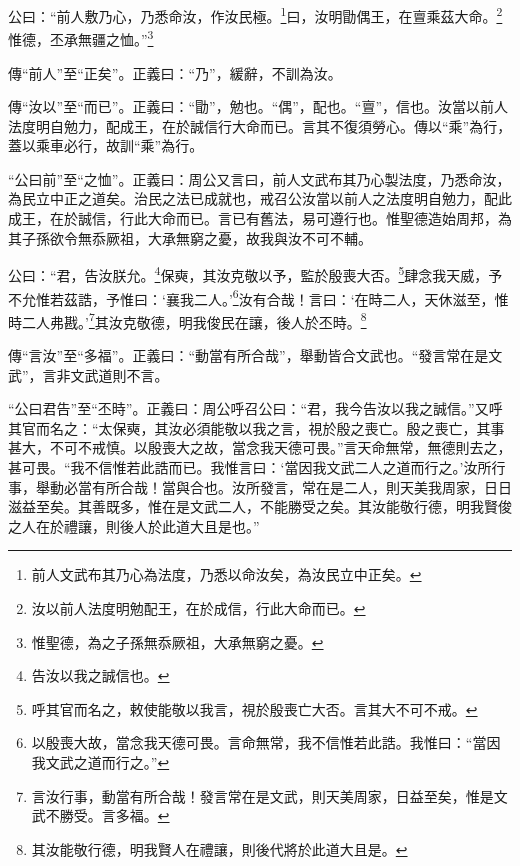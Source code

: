 公曰：“前人敷乃心，乃悉命汝，作汝民極。\footnote{前人文武布其乃心為法度，乃悉以命汝矣，為汝民立中正矣。}曰，汝明勖偶王，在亶乘茲大命。\footnote{汝以前人法度明勉配王，在於成信，行此大命而已。}惟德，丕承無疆之恤。”\footnote{惟聖德，為之子孫無忝厥祖，大承無窮之憂。}


{\noindent\zhuan{}\fzbyks 傳“前人”至“正矣”。正義曰：“乃”，緩辭，不訓為汝。 \par}

{\noindent\zhuan{}\fzbyks 傳“汝以”至“而已”。正義曰：“勖”，勉也。“偶”，配也。“亶”，信也。汝當以前人法度明自勉力，配成王，在於誠信行大命而已。言其不復須勞心。傳以“乘”為行，蓋以乘車必行，故訓“乘”為行。 \par}

{\noindent\shu{}\fzkt “公曰前”至“之恤”。正義曰：周公又言曰，前人文武布其乃心製法度，乃悉命汝，為民立中正之道矣。治民之法已成就也，戒召公汝當以前人之法度明自勉力，配此成王，在於誠信，行此大命而已。言已有舊法，易可遵行也。惟聖德造始周邦，為其子孫欲令無忝厥祖，大承無窮之憂，故我與汝不可不輔。 \par}

公曰：“君，告汝朕允。\footnote{告汝以我之誠信也。}保奭，其汝克敬以予，監於殷喪大否。\footnote{呼其官而名之，敕使能敬以我言，視於殷喪亡大否。言其大不可不戒。}肆念我天威，予不允惟若茲誥，予惟曰：‘襄我二人。’\footnote{以殷喪大故，當念我天德可畏。言命無常，我不信惟若此誥。我惟曰：“當因我文武之道而行之。”}汝有合哉！言曰：‘在時二人，天休滋至，惟時二人弗戡。’\footnote{言汝行事，動當有所合哉！發言常在是文武，則天美周家，日益至矣，惟是文武不勝受。言多福。}其汝克敬德，明我俊民在讓，後人於丕時。\footnote{其汝能敬行德，明我賢人在禮讓，則後代將於此道大且是。}


{\noindent\zhuan{}\fzbyks 傳“言汝”至“多福”。正義曰：“動當有所合哉”，舉動皆合文武也。“發言常在是文武”，言非文武道則不言。 \par}

{\noindent\shu{}\fzkt “公曰君告”至“丕時”。正義曰：周公呼召公曰：“君，我今告汝以我之誠信。”又呼其官而名之：“太保奭，其汝必須能敬以我之言，視於殷之喪亡。殷之喪亡，其事甚大，不可不戒慎。以殷喪大之故，當念我天德可畏。”言天命無常，無德則去之，甚可畏。“我不信惟若此誥而已。我惟言曰：‘當因我文武二人之道而行之。’汝所行事，舉動必當有所合哉！當與合也。汝所發言，常在是二人，則天美我周家，日日滋益至矣。其善既多，惟在是文武二人，不能勝受之矣。其汝能敬行德，明我賢俊之人在於禮讓，則後人於此道大且是也。” \par}

